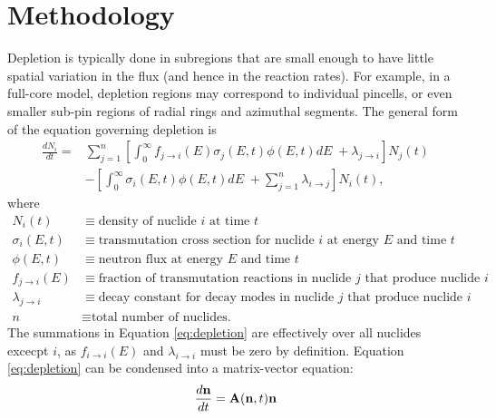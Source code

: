 \section{Methodology}
    \label{sec:methods}
    Depletion is typically done in subregions that are small enough to have
    little spatial variation in the flux (and hence in the reaction rates). For
    example, in a full-core model, depletion regions may correspond to
    individual pincells, or even smaller sub-pin regions of radial rings and
    azimuthal segments. The general form of the equation governing depletion is
    \begin{equation}
      \label{eq:depletion}
      \begin{split}
        \frac{dN_i}{dt} = &\sum\limits_{j=1}^n \left[ \int_0^\infty 
        f_{j \rightarrow i}(E) \sigma_j (E, t) \phi(E,t) dE \;+ \lambda_{j\rightarrow i}
        \right] N_j(t) \\ &- \left [\int_0^\infty \sigma_i (E,t) \phi(E,t) dE \; +
        \sum\limits_{j=1}^n \lambda_{i\rightarrow j} \right ] N_i(t),
      \end{split}
    \end{equation}
    where
    \begin{equation*}
      \begin{split}
        N_i(t) &\equiv \text{density of nuclide $i$ at time $t$} \\
        \sigma_i(E,t) &\equiv \text{transmutation cross section for nuclide $i$ at energy $E$ and time $t$} \\
        \phi(E,t) &\equiv \text{neutron flux at energy $E$ and time $t$} \\
        f_{j \rightarrow i}(E) &\equiv \text{fraction of transmutation reactions in nuclide $j$ that produce nuclide $i$} \\
        \lambda_{j \rightarrow i} &\equiv \text{decay constant for decay modes in nuclide $j$ that produce nuclide $i$} \\
        n &\equiv \text{total number of nuclides.}
      \end{split}
    \end{equation*}
    The summations in Equation \ref{eq:depletion} are effectively over all
    nuclides excecpt $i$, as $f_{i \rightarrow i}(E)$ and $\lambda_{i \rightarrow i}$ must
    be zero by definition. Equation \ref{eq:depletion} can be condensed into a
    matrix-vector equation:
    \begin{equation}
      \label{eq:depletion-matrix-t}
      \frac{d\mathbf{n}}{dt} = \mathbf{A}(\mathbf{n},t)\mathbf{n}
    \end{equation}
